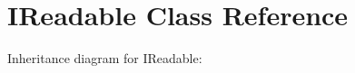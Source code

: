 \hypertarget{classIReadable}{}\section{I\+Readable Class Reference}
\label{classIReadable}


Inheritance diagram for I\+Readable\+:
